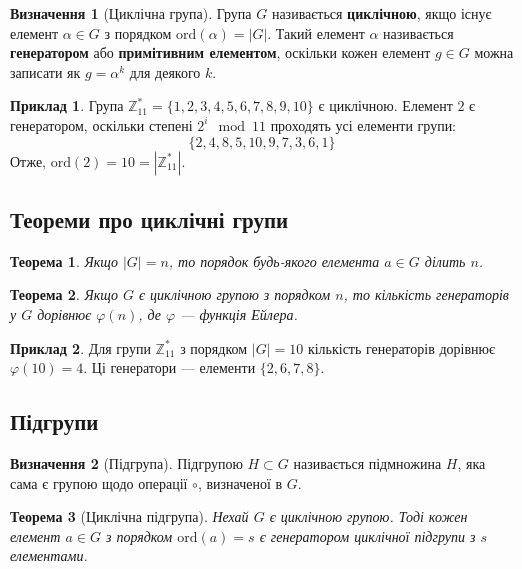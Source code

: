 \documentclass[12pt]{report}
\theoremstyle{definition}
\newtheorem{definition}{Визначення}[chapter]
\newtheorem{example}{Приклад}[chapter]
\theoremstyle{plain}
\newtheorem{theorem}{Теорема}[chapter]
\begin{document}
\begin{definition}[Циклічна група]
Група \( G \) називається \textbf{циклічною}, якщо існує елемент \( \alpha \in G \) з порядком \( \text{ord}(\alpha) = |G| \). Такий елемент \( \alpha \) називається \textbf{генератором} або \textbf{примітивним елементом}, оскільки кожен елемент \( g \in G \) можна записати як \( g = \alpha^k \) для деякого \( k \).
\end{definition}

\begin{example}
Група \( \mathbb{Z}^*_{11} = \{1, 2, 3, 4, 5, 6, 7, 8, 9, 10\} \) є циклічною. Елемент \( 2 \) є генератором, оскільки степені \( 2^i \mod 11 \) проходять усі елементи групи:
\[
\{2, 4, 8, 5, 10, 9, 7, 3, 6, 1\}
\]
Отже, \( \text{ord}(2) = 10 = |\mathbb{Z}^*_{11}| \).
\end{example}

\subsection{Теореми про циклічні групи}

\begin{theorem}
Якщо \( |G| = n \), то порядок будь-якого елемента \( a \in G \) ділить \( n \).
\end{theorem}

\begin{theorem}
Якщо \( G \) є циклічною групою з порядком \( n \), то кількість генераторів у \( G \) дорівнює \( \varphi(n) \), де \( \varphi \) — функція Ейлера.
\end{theorem}

\begin{example}
Для групи \( \mathbb{Z}^*_{11} \) з порядком \( |G| = 10 \) кількість генераторів дорівнює \( \varphi(10) = 4 \). Ці генератори — елементи \( \{2, 6, 7, 8\} \).
\end{example}

\subsection{Підгрупи}

\begin{definition}[Підгрупа]
Підгрупою \( H \subset G \) називається підмножина \( H \), яка сама є групою щодо операції \( \circ \), визначеної в \( G \).
\end{definition}

\begin{theorem}[Циклічна підгрупа]
Нехай \( G \) є циклічною групою. Тоді кожен елемент \( a \in G \) з порядком \( \text{ord}(a) = s \) є генератором циклічної підгрупи з \( s \) елементами.
\end{theorem}
\end{document}
